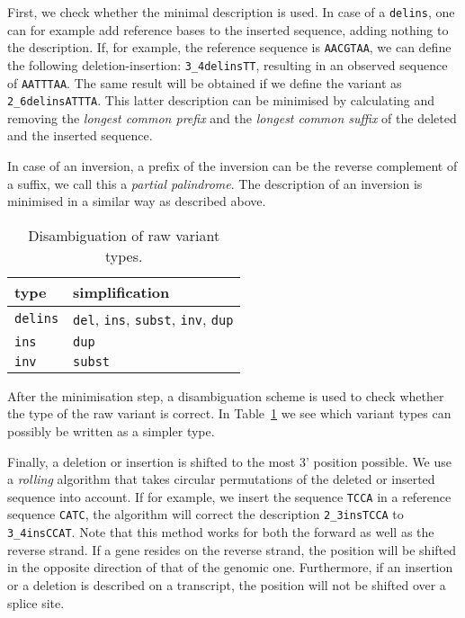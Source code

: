 \documentclass{article}
\begin{document}
First, we check whether the minimal description is used. In case of a
\texttt{delins}, one can for example add reference bases to the inserted
sequence, adding nothing to the description. If, for example, the reference
sequence is \texttt{AACGTAA}, we can define the following deletion-insertion:
\texttt{3\_4delinsTT}, resulting in an observed sequence of \texttt{AATTTAA}.
The same result will be obtained if we define the variant as
\texttt{2\_6delinsATTTA}. This latter description can be minimised by
calculating and removing the \emph{longest common prefix} and the \emph{longest
common suffix} of the deleted and the inserted sequence.

In case of an inversion, a prefix of the inversion can be the reverse
complement of a suffix, we call this a \emph{partial palindrome}. The
description of an inversion is minimised in a similar way as described above.

\begin{table}
  \begin{center}
    \caption{Disambiguation of raw variant types.}
    \begin{tabular}{l|l}
      type            & simplification\\
      \hline
      \texttt{delins} & \texttt{del}, \texttt{ins}, \texttt{subst},
        \texttt{inv}, \texttt{dup}\\
      \texttt{ins}    & \texttt{dup}\\
      \texttt{inv}    & \texttt{subst}
    \end{tabular}
  \end{center}
  \label{tab:typedisambiguation}
\end{table}

After the minimisation step, a disambiguation scheme is used to check whether
the type of the raw variant is correct. In Table~\ref{tab:typedisambiguation}
we see which variant types can possibly be written as a simpler type.

Finally, a deletion or insertion is shifted to the most 3' position possible.
We use a \emph{rolling} algorithm that takes circular permutations of the
deleted  or inserted sequence into account. If for example, we insert the
sequence \texttt{TCCA} in a reference sequence \texttt{CATC}, the
algorithm will correct the description \texttt{2\_3insTCCA} to
\texttt{3\_4insCCAT}. Note that this method works for both the forward as well
as the reverse strand. If a gene resides on the reverse strand, the position
will be shifted in the opposite direction of that of the genomic one.
Furthermore, if an insertion or a deletion is described on a transcript, the
position will not be shifted over a splice site.
\end{document}
